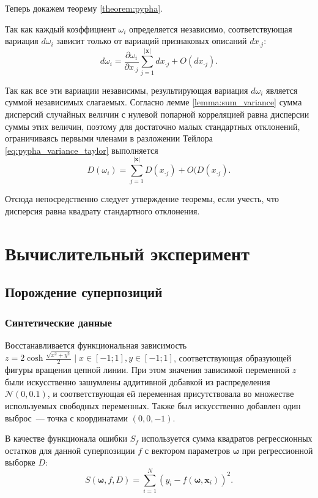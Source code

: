\documentclass[12pt,a4paper]{article}
\begin{document}
Теперь докажем теорему \ref{theorem:pypha}.
\begin{Proof}
  Так как каждый коэффициент $\omega_i$ определяется независимо, соответствующая
  вариация $d \omega_i$ зависит только от вариаций признаковых описаний
  $d x_{\cdot j}$:
  \begin{equation}
    d \omega_i = \frac{\partial \omega_i}{\partial x_{\cdot j}} \sum_{j = 1}^{|\mathbf{x}|} d x_{\cdot j} + O(d x_{\cdot j}).
    \label{eq:pypha_variance_taylor}
  \end{equation}
  
  Так как все эти вариации независимы, результирующая вариация $d\omega_i$ является
  суммой независимых слагаемых. Согласно лемме \ref{lemma:sum_variance} сумма дисперсий
  случайных величин с нулевой попарной корреляцией равна дисперсии
  суммы этих величин, поэтому для достаточно малых стандартных отклонений,
  ограничиваясь первыми членами в разложении Тейлора \eqref{eq:pypha_variance_taylor}
  выполняется
  \[
    D(\omega_i) = \sum_{j = 1}^{|\mathbf{x}|} D(x_{\cdot j}) + O(D (x_{\cdot j}).
  \]
  
  Отсюда непосредственно следует утверждение теоремы, если учесть, что
  дисперсия равна квадрату стандартного отклонения.
\end{Proof}

\section{Вычислительный эксперимент}

\subsection{Порождение суперпозиций}

\subsubsection{Синтетические данные}
Восстанавливается функциональная зависимость
$z = 2 \cosh \frac{\sqrt{x^2 + y^2}}{2} \mid x \in [-1; 1], y \in [-1; 1]$,
соответствующая образующей фигуры вращения цепной линии. При этом значения зависимой
переменной $z$ были искусственно зашумлены аддитивной добавкой из
распределения $\mathcal{N} (0, 0.1)$, и соответствующая ей переменная
присутствовала во множестве используемых свободных переменных.
Также был искусственно добавлен один
выброс~--- точка с координатами $(0, 0, -1)$.

В качестве функционала ошибки $S_f$ используется сумма квадратов
регрессионных остатков для данной суперпозиции $f$ с вектором параметров
$\boldsymbol{\omega}$ при регрессионной выборке $D$:
\begin{equation}
  \label{eq:sse_expr}
  S(\boldsymbol{\omega}, f, D) = \sum_{i=1}^N (y_i - f (\boldsymbol{\omega}, \mathbf{x}_i))^2.
\end{equation}
\end{document}
